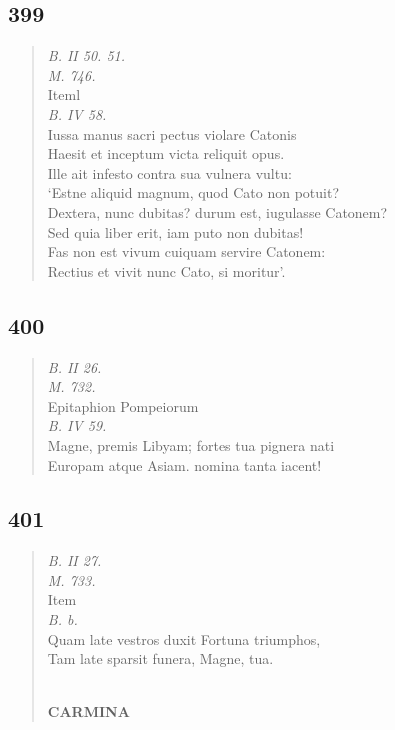 \documentclass[11pt, a4paper]{report}
\begin{document}
            \subsection*{399}
      \begin{verse}
      \textit{B. II 50. 51.} \\ \textit{M. 746.} \\  \lbrack Iteml \\ \textit{B. IV 58.} \\ Iussa manus sacri pectus violare Catonis \\ Haesit et inceptum victa reliquit opus. \\ Ille ait infesto contra sua vulnera vultu: \\ ‘Estne aliquid magnum, quod Cato non potuit? \\ Dextera, nunc dubitas? durum est, iugulasse Catonem? \\ Sed quia liber erit, iam puto non dubitas! \\ Fas non est vivum cuiquam servire Catonem: \\ Rectius et vivit nunc Cato, si moritur’. \\ 
      \end{verse}
  
            \subsection*{400}
      \begin{verse}
      \textit{B. II 26.} \\ \textit{M. 732.} \\ Epitaphion Pompeiorum \\ \textit{B. IV 59.} \\ Magne, premis Libyam; fortes tua pignera nati \\ Europam atque Asiam. nomina tanta iacent! \\ 
      \end{verse}
  
            \subsection*{401}
      \begin{verse}
      \textit{B. II 27.} \\ \textit{M. 733.} \\  \lbrack Item \rbrack  \\ \textit{B. b.} \\ Quam late vestros duxit Fortuna triumphos, \\ Tam late sparsit funera, Magne, tua. \\ 
        ﻿\pagebreak 
    \begin{center} \textbf{CARMINA} \end{center} \marginpar{[314]} 
      \end{verse}
  
\end{document}
